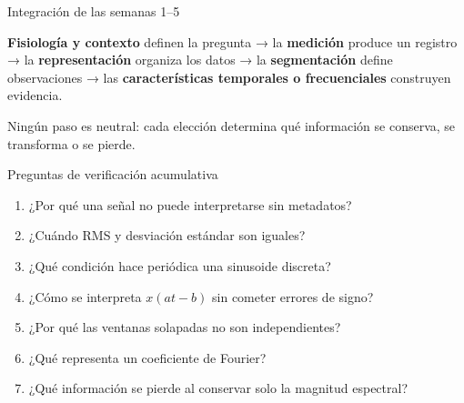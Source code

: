 \documentclass[
  ignorenonframetext,
  aspectratio=169,
  spanish,
  professionalfonts]{beamer}
\providecommand{\tightlist}{%
  \setlength{\itemsep}{0pt}\setlength{\parskip}{0pt}}
\begin{document}
\begin{frame}{Integración de las semanas 1--5}
\protect{}\label{integraciuxf3n-de-las-semanas-15}
\begin{tcolorbox}[enhanced jigsaw, arc=.35mm, bottomrule=.15mm, bottomtitle=1mm, breakable, colback=white, colbacktitle=quarto-callout-important-color!10!white, colframe=quarto-callout-important-color-frame, coltitle=black, left=2mm, leftrule=.75mm, opacityback=0, opacitybacktitle=0.6, rightrule=.15mm, title={Cadena conceptual}, titlerule=0mm, toprule=.15mm, toptitle=1mm]

\textbf{Fisiología y contexto} definen la pregunta → la
\textbf{medición} produce un registro → la \textbf{representación}
organiza los datos → la \textbf{segmentación} define observaciones → las
\textbf{características temporales o frecuenciales} construyen
evidencia.

\end{tcolorbox}

Ningún paso es neutral: cada elección determina qué información se
conserva, se transforma o se pierde.
\end{frame}

\begin{frame}{Preguntas de verificación acumulativa}
\protect{}\label{preguntas-de-verificaciuxf3n-acumulativa}
\begin{enumerate}
\tightlist
\item
  ¿Por qué una señal no puede interpretarse sin metadatos?
\item
  ¿Cuándo RMS y desviación estándar son iguales?
\item
  ¿Qué condición hace periódica una sinusoide discreta?
\item
  ¿Cómo se interpreta \(x(at-b)\) sin cometer errores de signo?
\item
  ¿Por qué las ventanas solapadas no son independientes?
\item
  ¿Qué representa un coeficiente de Fourier?
\item
  ¿Qué información se pierde al conservar solo la magnitud espectral?
\end{enumerate}
\end{frame}
\end{document}
